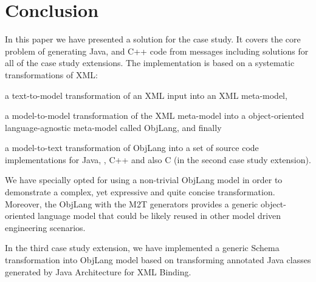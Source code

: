
\section{Conclusion}
\label{sec:Conclusion}

In this paper we have presented a \SIGMA solution for the \TTC \FIXML case study.
It covers the core problem of generating Java, \Csharp and C++ code from \FIXML messages including solutions for all of the case study extensions.
The implementation is based on a systematic transformations of XML:
\begin{inparaenum}[(1)]
	\item a text-to-model transformation of an XML input into an XML meta-model,
	\item a model-to-model transformation of the XML meta-model into a object-oriented language-agnostic meta-model called ObjLang, and finally
	\item a model-to-text transformation of ObjLang into a set of source code implementations for Java, \Csharp, C++ and also C (in the second case study extension).
\end{inparaenum}
We have specially opted for using a non-trivial ObjLang model in order to demonstrate a complex, yet expressive and quite concise transformation.
Moreover, the ObjLang with the M2T generators provides a generic object-oriented language model that could be likely reused in other model driven engineering scenarios.

In the third case study extension, we have implemented a generic \FIXML Schema transformation into ObjLang model based on transforming annotated Java classes generated by Java Architecture for XML Binding.